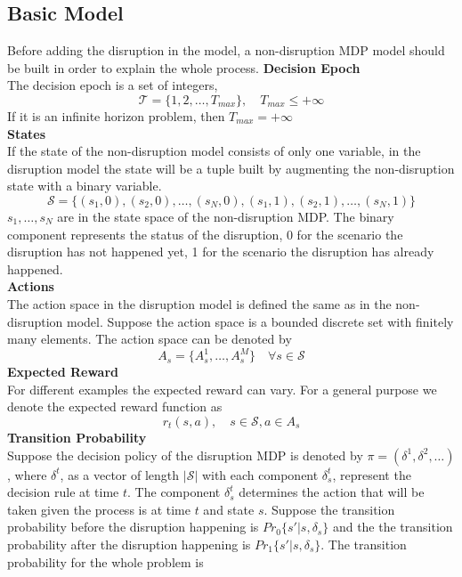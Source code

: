 \documentclass[11pt]{article}
\begin{document}
	\subsection{Basic Model}
		Before adding the disruption in the model, a non-disruption MDP model should be built in order to explain the whole process.
		\newline \textbf{Decision Epoch}\\
		The decision epoch is a set of integers, \[\mathscr{T}=\{1,2,\dots,T_{max}\},\quad  T_{max} \leq +\infty\]
		If it is an infinite horizon problem, then \(T_{max} = +\infty\)\\
		\newline \textbf{States}\\
		If the state of the non-disruption model consists of only one variable, in the disruption model the state will be a tuple built by augmenting the non-disruption state with a binary variable. \[\mathscr{S}=\{(s_1,0),(s_2,0),\dots,(s_N,0),(s_1,1),(s_2,1),\dots,(s_N,1)\}\] \(s_1,\dots,s_N\) are in the state space of the non-disruption MDP. The binary component represents the status of the disruption, 0 for the scenario the disruption has not happened yet, 1 for the scenario the disruption has already happened.\\
		\newline \textbf{Actions}\\
		The action space in the disruption model is defined the same as in the non-disruption model. Suppose the action space is a bounded discrete set with finitely many elements. The action space can be denoted by \[A_s=\{A_s^1,\dots,A_s^M\} \quad \forall s \in \mathscr{S}\]
		\newline \textbf{Expected Reward}\\
		For different examples the expected reward can vary. For a general purpose we denote the expected reward function as \[r_t(s,a), \quad s \in \mathscr{S}, a \in A_s\]
		\newline \textbf{Transition Probability}\\
		Suppose the decision policy of the disruption MDP is denoted by \(\pi = (\delta^1,\delta^2,\dots)\), where \(\delta^t\), as a vector of length \(|\mathscr{S}|\) with each component \(\delta^t_s\), represent the decision rule at time \(t\). The component \(\delta^t_s\) determines the action that will be taken given the process is at time \(t\) and state \(s\). Suppose the transition probability before the disruption happening is \(Pr_0\{s'|s,\delta_s\}\) and the the transition probability after the disruption happening is \(Pr_1\{s'|s,\delta_s\}\). The transition probability for the whole problem is
\end{document}
